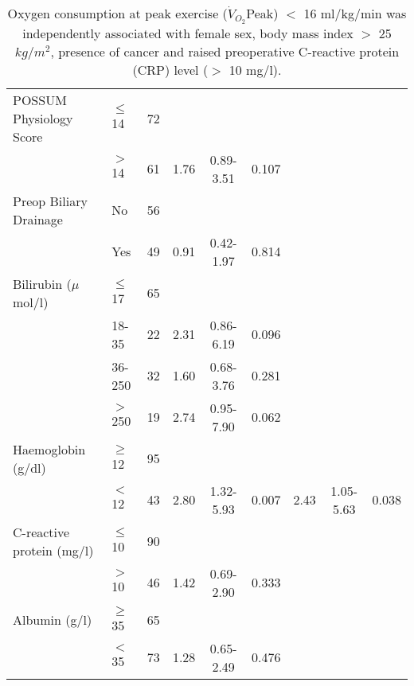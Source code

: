 \begin{sidewaystable}[p]
\begin{tabular}{|l l c| c c c| c c c|}
		POSSUM Physiology Score    & $\leq$ 14 & 72  &      &           &            &      &           &  \\
		                           & $>$ 14    & 61  & 1.76 & 0.89-3.51 & 0.107      &      &           &  \\
		Preop Biliary Drainage     & No        & 56  &      &           &            &      &           &  \\
		                           & Yes       & 49  & 0.91 & 0.42-1.97 & 0.814      &      &           &  \\
		Bilirubin ($\mu$mol/l)     & $\leq$ 17 & 65  &      &           &            &      &           &  \\
		                           & 18-35     & 22  & 2.31 & 0.86-6.19 & 0.096      &      &           &  \\
		                           & 36-250    & 32  & 1.60 & 0.68-3.76 & 0.281      &      &           &  \\
		                           & $>$ 250   & 19  & 2.74 & 0.95-7.90 & 0.062      &      &           &  \\
		Haemoglobin (g/dl)         & $\geq$ 12 & 95  &      &           &            &      &           &  \\
		                           & $<$ 12    & 43  & 2.80 & 1.32-5.93 & 0.007      & 2.43 & 1.05-5.63 & 0.038      \\
		C-reactive protein (mg/l)  & $\leq$ 10 & 90  &      &           &            &      &           &  \\
		                           & $>$ 10    & 46  & 1.42 & 0.69-2.90 & 0.333      &      &           &  \\
		Albumin (g/l)              & $\geq$ 35 & 65  &      &           &            &      &           &  \\
		                           & $<$ 35    & 73  & 1.28 & 0.65-2.49 & 0.476      &      &           &  \\ \hline
	\end{tabular}
	\medskip
	\caption*{Oxygen consumption at peak exercise ($\dot{V}_{O_2}$Peak) $<$ 16 ml/kg/min was independently associated with female sex, body mass index $>$ 25 $kg/m^2$, presence of cancer and raised preoperative C-reactive protein (CRP) level ($>$ 10 mg/l).}
\end{sidewaystable}